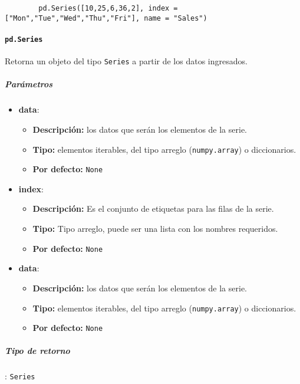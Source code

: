 \begin{verbatim}
        pd.Series([10,25,6,36,2], index = ["Mon","Tue","Wed","Thu","Fri"], name = "Sales")
        \end{verbatim}
\paragraph{\texttt{pd.Series}} Retorna un objeto del tipo \texttt{Series} a
partir de los datos ingresados.

\subparagraph{Parámetros}
\begin{itemize}
    \item \textbf{data}:
          \begin{itemize}
              \item \textbf{Descripción:} los datos que serán los elementos de
                    la serie.
              \item \textbf{Tipo:} elementos iterables, del tipo arreglo
                    (\texttt{numpy.array}) o diccionarios.
              \item \textbf{Por defecto:} \texttt{None}
          \end{itemize}
    \item \textbf{index}:
          \begin{itemize}
              \item \textbf{Descripción:} Es el conjunto de etiquetas para las
                    filas de la serie.
              \item \textbf{Tipo:} Tipo arreglo, puede ser una lista con los
                    nombres requeridos.
              \item \textbf{Por defecto:} \texttt{None}
          \end{itemize}
    \item \textbf{data}:
          \begin{itemize}
              \item \textbf{Descripción:} los datos que serán los elementos de
                    la serie.
              \item \textbf{Tipo:} elementos iterables, del tipo arreglo
                    (\texttt{numpy.array}) o diccionarios.
              \item \textbf{Por defecto:} \texttt{None}
          \end{itemize}
\end{itemize}

\subparagraph{Tipo de retorno}: \texttt{Series}

